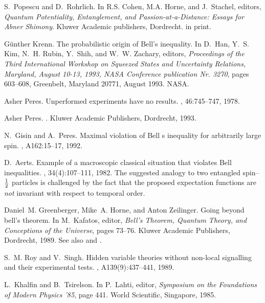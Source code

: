 \begin{thebibliography}{10}
S.~Popescu and D.~Rohrlich.
\newblock In R.S. Cohen, M.A. Horne, and J.~Stachel, editors, {\em Quantum
  Potentiality, Entanglement, and Passion-at-a-Distance: Essays for Abner
  Shimony}. Kluwer Academic publishers, Dordrecht.
\newblock in print.

G{\"{u}}nther Krenn.
\newblock The probabilistic origin of {B}ell's inequality.
\newblock In D.~Han, Y.~S. Kim, N.~H. Rubin, Y.~Shih, and W.~W. Zachary,
  editors, {\em Proceedings of the Third International Workshop on Squeezed
  States and Uncertainty Relations, Maryland, August 10-13, 1993, NASA
  Conference publication Nr. 3270}, pages 603--608, Greenbelt, Maryland 20771,
  August 1993. NASA.

Asher Peres.
\newblock Unperformed experiments have no results.
, 46:745--747, 1978.

Asher Peres.
.
\newblock Kluwer Academic Publishers, Dordrecht, 1993.

N.~Gisin and A.~Peres.
\newblock Maximal violation of {B}ell s inequality for arbitrarily large spin.
, A162:15--17, 1992.

D.~Aerts.
\newblock Example of a macroscopic classical situation that violates {B}ell
  inequalities.
, 34(4):107--111, 1982.
\newblock The suggested analogy to two entangled spin--${1\over 2}$ particles
  is challenged by the fact that the proposed expectation functions are {\em
  not} invariant with respect to temporal order.

Daniel~M. Greenberger, Mike~A. Horne, and Anton Zeilinger.
\newblock Going beyond bell's theorem.
\newblock In M.~Kafatos, editor, {\em Bell's Theorem, Quantum Theory, and
  Conceptions of the {U}niverse}, pages 73--76. Kluwer Academic Publishers,
  Dordrecht, 1989.
\newblock See also \cite{ghsz} and \cite{mermin}.

S.~M. Roy and V.~Singh.
\newblock Hidden variable theories without non-local signalling and their
  experimental tests.
, A139(9):437--441, 1989.

L.~Khalfin and B.~Tsirelson.
\newblock In P.~Lahti, editor, {\em Symposium on the Foundations of Modern
  Physics '85}, page 441. World Scientific, Singapore, 1985.


\end{thebibliography}
